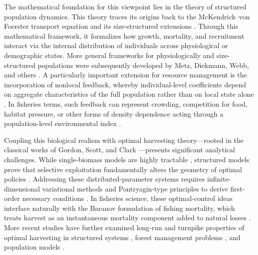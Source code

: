 \documentclass[pdflatex,sn-mathphys-num]{sn-jnl}
\theoremstyle{thmstyleone}
\theoremstyle{definition}
\theoremstyle{remark}
\begin{document}
The mathematical foundation for this viewpoint lies in the theory of structured population dynamics. 
This theory traces its origins back to the McKendrick--von Foerster transport equation and its size-structured extensions \cite{mkendrick_applications_1925,banasiak_mckendrickvon_2025,sinko_new_1967}.
Through this mathematical framework, it formalizes how growth, mortality, and recruitment interact via the internal distribution of individuals across physiological or demographic states. 
More general frameworks for physiologically and size-structured populations were subsequently developed by Metz, Diekmann, Webb, and others \cite{metz_dynamics_1986,webb_theory_1985,barril_formulation_2022,andrusyak_mathematical_2024,clement_bifurcation_2025}. 
A particularly important extension for resource management is the incorporation of nonlocal feedback, whereby individual-level coefficients depend on aggregate characteristics of the full population rather than on local state alone \cite{goetz_forest_2010}.
In fisheries terms, such feedback can represent crowding, competition for food, habitat pressure, or other forms of density dependence acting through a population-level environmental index \cite{hritonenko_maximum_2008,hritonenko_bangbang_2009}.

Coupling this biological realism with optimal harvesting theory—rooted in the classical works of Gordon, Scott, and Clark \cite{gordon_economic_1954,scott_fishery_1955,clark_economics_1975,clark_mathematical_1976,clark_worldwide_2007}—presents significant analytical challenges. While single-biomass models are highly tractable \cite{schaefer_aspects_1991,spence_most_1975}, structured models prove that selective exploitation fundamentally alters the geometry of optimal policies \cite{beverton_dynamics_1993,reed_optimum_1980,tahvonen_economics_2009,skonhoft_optimal_2012}. Addressing these distributed-parameter systems requires infinite-dimensional variational methods and Pontryagin-type principles to derive first-order necessary conditions \cite{anita_analysis_2000,wang2026breakdown,kakumani_optimal_2026,yi_age-dependent_2025}. 
In fisheries science, these optimal-control ideas interface naturally with the Baranov formulation of fishing mortality, which treats harvest as an instantaneous mortality component added to natural losses  \cite{quinn_quantitative_1999,hilborn_quantitative_1992,yu2026fullcovariance}.
More recent studies have further examined long-run and turnpike properties of optimal harvesting in structured systems \cite{hritonenko_optimization_2006}, forest management problems \cite{cominetti_asymptotic_2009}, and population models \cite{djema_turnpike_2021}.
\end{document}
